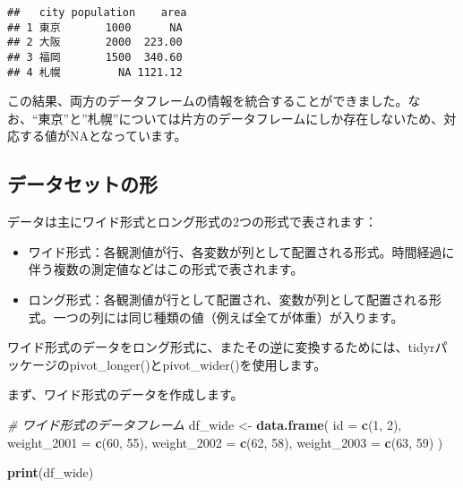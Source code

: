 \documentclass[
]{article}
\newenvironment{Shaded}{\begin{snugshade}}{\end{snugshade}}
\newcommand{\AttributeTok}[1]{\textcolor[rgb]{0.13,0.29,0.53}{#1}}
\newcommand{\CommentTok}[1]{\textcolor[rgb]{0.56,0.35,0.01}{\textit{#1}}}
\newcommand{\DecValTok}[1]{\textcolor[rgb]{0.00,0.00,0.81}{#1}}
\newcommand{\FunctionTok}[1]{\textcolor[rgb]{0.13,0.29,0.53}{\textbf{#1}}}
\newcommand{\NormalTok}[1]{#1}
\newcommand{\OtherTok}[1]{\textcolor[rgb]{0.56,0.35,0.01}{#1}}
\providecommand{\tightlist}{%
  \setlength{\itemsep}{0pt}\setlength{\parskip}{0pt}}
\begin{document}
\begin{verbatim}
##   city population    area
## 1 東京       1000      NA
## 2 大阪       2000  223.00
## 3 福岡       1500  340.60
## 4 札幌         NA 1121.12
\end{verbatim}

この結果、両方のデータフレームの情報を統合することができました。なお、``東京''と''札幌''については片方のデータフレームにしか存在しないため、対応する値がNAとなっています。

\hypertarget{ux30c7ux30fcux30bfux30bbux30c3ux30c8ux306eux5f62}{%
\subsection{データセットの形}\label{ux30c7ux30fcux30bfux30bbux30c3ux30c8ux306eux5f62}}

データは主にワイド形式とロング形式の2つの形式で表されます：

\begin{itemize}
\tightlist
\item
  ワイド形式：各観測値が行、各変数が列として配置される形式。時間経過に伴う複数の測定値などはこの形式で表されます。
\item
  ロング形式：各観測値が行として配置され、変数が列として配置される形式。一つの列には同じ種類の値（例えば全てが体重）が入ります。
\end{itemize}

ワイド形式のデータをロング形式に、またその逆に変換するためには、tidyrパッケージのpivot\_longer()とpivot\_wider()を使用します。

まず、ワイド形式のデータを作成します。

\begin{Shaded}
\begin{Highlighting}[]
\CommentTok{\# ワイド形式のデータフレーム}
\NormalTok{df\_wide }\OtherTok{\textless{}{-}} \FunctionTok{data.frame}\NormalTok{(}
  \AttributeTok{id =} \FunctionTok{c}\NormalTok{(}\DecValTok{1}\NormalTok{, }\DecValTok{2}\NormalTok{),}
  \AttributeTok{weight\_2001 =} \FunctionTok{c}\NormalTok{(}\DecValTok{60}\NormalTok{, }\DecValTok{55}\NormalTok{),}
  \AttributeTok{weight\_2002 =} \FunctionTok{c}\NormalTok{(}\DecValTok{62}\NormalTok{, }\DecValTok{58}\NormalTok{),}
  \AttributeTok{weight\_2003 =} \FunctionTok{c}\NormalTok{(}\DecValTok{63}\NormalTok{, }\DecValTok{59}\NormalTok{)}
\NormalTok{)}

\FunctionTok{print}\NormalTok{(df\_wide)}
\end{Highlighting}
\end{Shaded}
\end{document}
